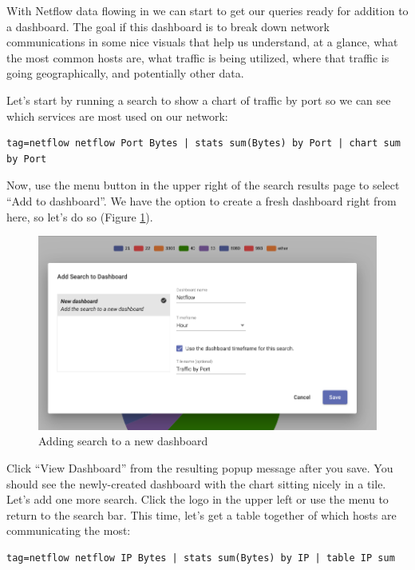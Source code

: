 With Netflow data flowing in we can start to get our queries ready for
addition to a dashboard. The goal if this dashboard is to break down
network communications in some nice visuals that help us understand, at
a glance, what the most common hosts are, what traffic is being
utilized, where that traffic is going geographically, and potentially
other data.

Let's start by running a search to show a chart of traffic by port so we can
see which services are most used on our network:

\begin{Verbatim}[breaklines=true]
tag=netflow netflow Port Bytes | stats sum(Bytes) by Port | chart sum by Port
\end{Verbatim}

Now, use the menu button in the upper right of the search results page to select ``Add to
dashboard''. We have the option to create a fresh dashboard right from
here, so let's do so (Figure \ref{fig:new-dashboard}).

\begin{figure}
	\includegraphics{images/new-dashboard.png}
	\caption{Adding search to a new dashboard}
	\label{fig:new-dashboard}
\end{figure}

Click ``View Dashboard'' from the resulting popup message after you
save. You should see the newly-created dashboard with the chart sitting nicely in a
tile. Let's add one more search. Click the logo in the upper left or use
the menu to return to the search bar. This time, let's get a table
together of which hosts are communicating the most:

\begin{Verbatim}[breaklines=true]
tag=netflow netflow IP Bytes | stats sum(Bytes) by IP | table IP sum
\end{Verbatim}

